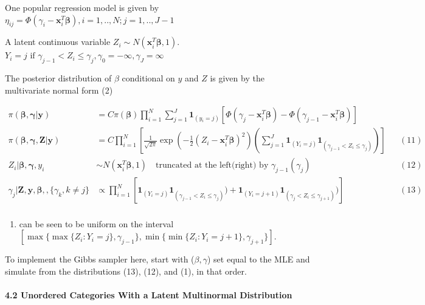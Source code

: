 \documentclass[
]{article}
\providecommand{\tightlist}{%
  \setlength{\itemsep}{0pt}\setlength{\parskip}{0pt}}
\begin{document}
One popular regression model is given by
\(\eta_{ij}=\Phi(\gamma_i-\mathbf{x}_i^T\boldsymbol{\beta}),i=1,..,N; j=1,..,J-1\)

A latent continuous variable
\(Z_i\sim N(\mathbf{x}_i^T\boldsymbol{\beta},1)\).
\(Y_i=j\text{ if } \gamma_{j-1}<Z_i\le\gamma_{j}, \gamma_{0}=-\infty,\gamma_{J}=\infty\)

The posterior distribution of \(\beta\) conditional on \(y\) and \(Z\)
is given by the multivariate normal form (2)

\[
\begin{align} 
\pi(\boldsymbol{\beta,\gamma|y})&= C\pi(\boldsymbol{\beta})\prod_{i=1}^{N}\sum_{j=1}^{J}\mathbf{1}_{(y_i=j)}[\Phi (\gamma_{j}-\mathbf{x}_i^T\boldsymbol{\beta})-\Phi (\gamma_{j-1}-\mathbf{x}_i^T\boldsymbol{\beta})]\\
\pi(\boldsymbol{\beta,\gamma,Z|y})&= C\prod_{i=1}^{N}\left[\frac{1}{\sqrt{2\pi}}\exp(-\frac12(Z_i-\mathbf{x}_i^T\boldsymbol{\beta})^2)(\sum_{j=1}^{J}\mathbf{1}_{(Y_i=j)}\mathbf{1}_{(\gamma_{j-1}<Z_i\le\gamma_{j})})\right]&&(11)\\
Z_i|\boldsymbol{\beta,\gamma},y_i&\sim N(\mathbf{x}_i^T\boldsymbol{\beta},1) \quad\text{truncated at the left(right) by } \gamma_{j-1}(\gamma_{j}) &&(12)\\
\gamma_j|\boldsymbol{Z,y,\beta,},\{\gamma_k,k\neq j\}&\propto  \prod_{i=1}^{N}\left[\mathbf{1}_{(Y_i=j)}\mathbf{1}_{(\gamma_{j-1}<Z_i\le\gamma_{j})})+\mathbf{1}_{(Y_i=j+1)}\mathbf{1}_{(\gamma_{j}<Z_i\le\gamma_{j+1})})\right]&&(13)\\
\end{align}
\]

\begin{enumerate}
\def\labelenumi{(\arabic{enumi})}
\setcounter{enumi}{12}
\tightlist
\item
  can be seen to be uniform on the interval
  \([\max \{\max \{Z_i: Y_i = j \}, \gamma_{j-1} \}, \min \{\min \{Z_i: Y_i = j + 1\}, \gamma_{j+1} \}]\).
\end{enumerate}

To implement the Gibbs sampler here, start with (\(\beta,\gamma\)) set
equal to the MLE and simulate from the distributions (13), (12), and
(1), in that order.

\hypertarget{unordered-categories-with-a-latent-multinormal-distribution}{%
\paragraph{4.2 Unordered Categories With a Latent Multinormal
Distribution}\label{unordered-categories-with-a-latent-multinormal-distribution}}
\end{document}
